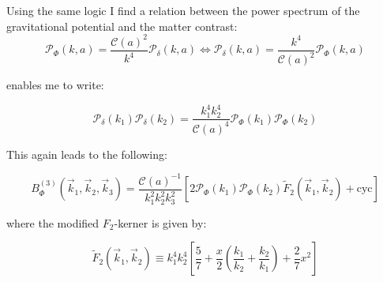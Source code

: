             Using the same logic I find a relation between the power spectrum of the gravitational potential and the matter contrast:
            \begin{equation}
                \mathcal{P}_\Phi(k,a) = \frac{\mathcal{C}(a)^2}{k^4} \mathcal{P}_\delta(k,a) \Longleftrightarrow \mathcal{P}_\delta(k,a) = \frac{k^4}{\mathcal{C}(a)^2} \mathcal{P}_\Phi(k,a)
            \end{equation}

            enables me to write:

            \begin{equation}
                \mathcal{P}_\delta(k_1)\mathcal{P}_\delta(k_2) = \frac{k_1^4k_2^4}{\mathcal{C}(a)^4} \mathcal{P}_\Phi(k_1)\mathcal{P}_\Phi(k_2)
            \end{equation}

            This again leads to the following:

            \begin{equation}
                B^{(3)}_\Phi(\vec{k}_1,\vec{k}_2,\vec{k}_3) = \frac{\mathcal{C}(a)^{-1}}{k_1^2k_2^2k_3^2} \left[2\mathcal{P}_\Phi(k_1)\mathcal{P}_\Phi(k_2)\tilde{F}_2(\vec{k}_1, \vec{k}_2) + \mathrm{cyc}\right]
            \end{equation}

            where the modified $F_2$-kerner is given by:

            \begin{equation}
                \tilde{F}_2(\vec{k}_1, \vec{k}_2) \equiv k_1^4k_2^4\left[\frac{5}{7} + \frac{x}{2}\left(\frac{k_1}{k_2}+\frac{k_2}{k_1}\right) + \frac{2}{7}x^2\right]
            \end{equation}




